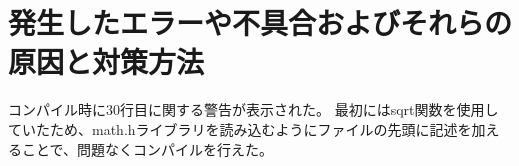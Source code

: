 

\section{発生したエラーや不具合およびそれらの原因と対策方法}
コンパイル時に30行目に関する警告が表示された。
最初にはsqrt関数を使用していたため、math.hライブラリを読み込むようにファイルの先頭に記述を加えることで、問題なくコンパイルを行えた。



